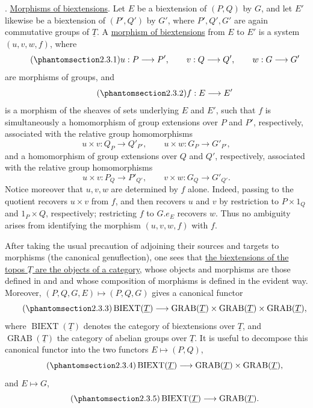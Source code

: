 
. \underline{Morphisms of biextensions}. Let $E$ be a biextension
of $(P,Q)$ by $G$, and let $E'$ likewise be a biextension of
$(P',Q')$ by $G'$, where $P',Q',G'$ are again commutative groups of
$\underline T$. A \underline{morphism of biextensions} from $E$ to
$E'$ is a system $(u,v,w,f)$, where
\begin{equation}\tag{\SGARefTarget{sga7.sga7i.evii.n2-3-1}{2.3.1}}
 u:P\longrightarrow P',\qquad
 v:Q\longrightarrow Q',\qquad
 w:G\longrightarrow G'
\end{equation}
are morphisms of groups, and
\begin{equation}\tag{\SGARefTarget{sga7.sga7i.evii.n2-3-2}{2.3.2}}
 f:E\longrightarrow E'
\end{equation}
is a morphism of the sheaves of sets underlying $E$ and $E'$, such
that $f$ is simultaneously a homomorphism of group extensions over
$P$ and $P'$, respectively, associated with the relative group
homomorphisms
\[
 u\times v:Q_P\longrightarrow Q'_{P'},
 \qquad
 u\times w:G_P\longrightarrow G'_{P'},
\]
and a homomorphism of group extensions over $Q$ and $Q'$, respectively,
associated with the relative group homomorphisms
\[
 u\times v:P_Q\longrightarrow P'_{Q'},
 \qquad
 v\times w:G_Q\longrightarrow G'_{Q'}.
\]
Notice moreover that $u,v,w$ are determined by $f$ alone. Indeed,
passing to the quotient recovers $u\times v$ from $f$, and then
recovers $u$ and $v$ by restriction to $P\times1_Q$ and
$1_P\times Q$, respectively; restricting $f$ to $G.e_E$ recovers
$w$. Thus no ambiguity arises from identifying the morphism
$(u,v,w,f)$ with $f$.

After taking the usual precaution of adjoining their sources and
targets to morphisms (the canonical genuflection), one sees that
\underline{the biextensions of the topos $\underline T$ are the
objects of a category}, whose objects and morphisms are those defined
in  and  and whose composition of morphisms is defined in the
evident way. Moreover, $(P,Q,G,E)\mapsto(P,Q,G)$ gives a canonical
functor
\begin{equation}\tag{\SGARefTarget{sga7.sga7i.evii.n2-3-3}{2.3.3}}
 \operatorname{BIEXT}(\underline T)
 \longrightarrow
 \operatorname{GRAB}(\underline T)\times
 \operatorname{GRAB}(\underline T)\times
 \operatorname{GRAB}(\underline T),
\end{equation}
where $\operatorname{BIEXT}(\underline T)$ denotes the category of
biextensions over $\underline T$, and
$\operatorname{GRAB}(\underline T)$ the category of abelian groups
over $\underline T$. It is useful to decompose this canonical functor
into the two functors $E\mapsto(P,Q)$,
\begin{equation}\tag{\SGARefTarget{sga7.sga7i.evii.n2-3-4}{2.3.4}}
 \operatorname{BIEXT}(\underline T)
 \longrightarrow
 \operatorname{GRAB}(\underline T)\times
 \operatorname{GRAB}(\underline T),
\end{equation}
and $E\mapsto G$,
\begin{equation}\tag{\SGARefTarget{sga7.sga7i.evii.n2-3-5}{2.3.5}}
 \operatorname{BIEXT}(\underline T)
 \longrightarrow
 \operatorname{GRAB}(\underline T).
\end{equation}

